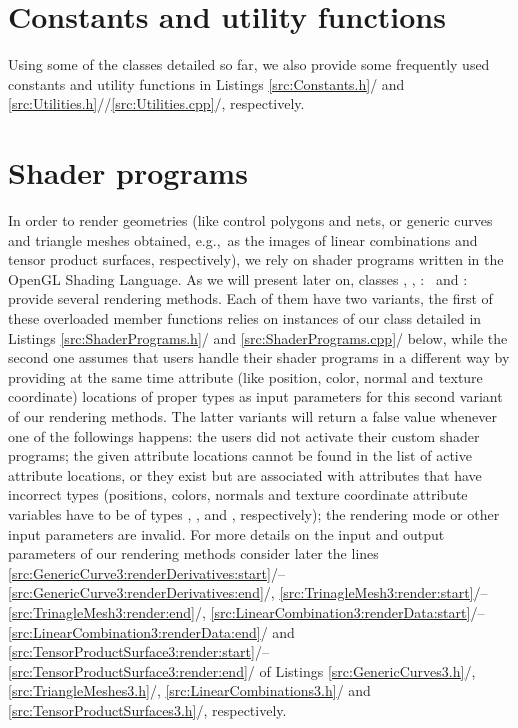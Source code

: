 \documentclass[b5paper, twosided]{book}
\newcommand{\CRed}[1]{{\color[rgb]{0.5, 0.0, 0.0}{#1}}}
\newcommand{\CBlue}[1]{{\color[rgb]{0.0, 0.0, 0.9}{#1}}}
\DeclareRobustCommand{\mref}[1]{\ref{#1}{\relsize{-1}/\pageref{#1}}}
\begin{document}
\section{Constants and utility functions}

Using some of the classes detailed so far, we also provide some frequently used constants and utility functions in Listings \mref{src:Constants.h} and \mref{src:Utilities.h}/\mref{src:Utilities.cpp}, respectively.




\section{Shader programs}

In order to render geometries (like control polygons and nets, or generic curves and triangle meshes obtained, e.g.,\ as the images of linear combinations and tensor product surfaces, respectively), we rely on shader programs written in the OpenGL Shading Language. As we will present later on, classes \CBlue{Generic\-Curve3}, \CBlue{TriangleMesh3}, \CBlue{BCurve3}:\ \CRed{public} \CBlue{LinearCombination3} and \CBlue{BSurface3}:\ \CRed{public} \CBlue{TensorProductSurface3} provide several rendering methods. Each of them have two variants, the first of these overloaded member functions relies on instances of our class \CBlue{ShaderProgram} detailed in Listings \mref{src:ShaderPrograms.h} and \mref{src:ShaderPrograms.cpp} below, while the second one assumes that users handle their shader programs in a different way by providing at the same time attribute (like position, color, normal and texture coordinate) locations of proper types as input parameters for this second variant of our rendering methods. The latter variants will return a false value whenever one of the followings happens: the users did not activate their custom shader programs; the given attribute locations cannot be found in the list of active attribute locations, or they exist but are associated with attributes that have incorrect types (positions, colors, normals and texture coordinate attribute variables have to be of types \CRed{vec3}, \CRed{vec4}, \CRed{vec3} and \CRed{vec4}, respectively); the rendering mode or other input parameters are invalid. For more details on the input and output parameters of our rendering methods consider later the lines \mref{src:GenericCurve3:renderDerivatives:start}--\mref{src:GenericCurve3:renderDerivatives:end}, \mref{src:TrinagleMesh3:render:start}--\mref{src:TrinagleMesh3:render:end},  \mref{src:LinearCombination3:renderData:start}--\mref{src:LinearCombination3:renderData:end} and \mref{src:TensorProductSurface3:render:start}--\mref{src:TensorProductSurface3:render:end} of Listings \mref{src:GenericCurves3.h}, \mref{src:TriangleMeshes3.h},  \mref{src:LinearCombinations3.h} and \mref{src:TensorProductSurfaces3.h}, respectively. 
\end{document}
